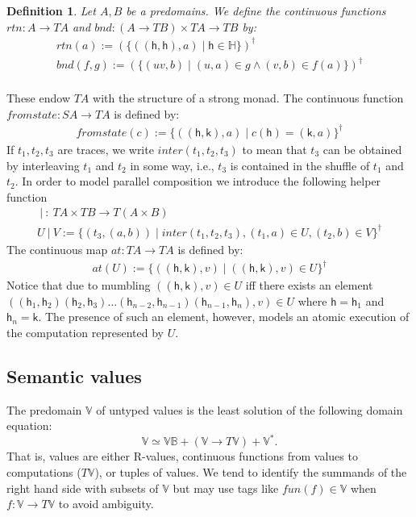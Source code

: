 \documentclass[nocopyrightspace,preprint]{sigplanconf}
\newcommand{\funn}[1]{\textit{fun}(#1)}
\newcommand{\semparallel}{~|~}
\newcommand{\Stores}{\ensuremath{\mathbb{H}}}
\newtheorem{definition}[theorem]{Definition}
\newcommand\heap{\ensuremath{\mathsf{h}}\xspace}
\newcommand\h{\heap}
\renewcommand\k{\ensuremath{\mathsf{k}}\xspace}
\newcommand{\Values}{\mathbb{V}}
\newcommand{\ValuesB}{\mathbb{VB}}
\newcommand{\tup}[1]{(#1)}
\begin{document}
\begin{definition}
Let $A,B$ be a predomains.  We define the continuous
functions $\textit{rtn} : A \rightarrow TA$ and $\textit{bnd} :
(A{\rightarrow} TB)\times TA\rightarrow TB$ by:
\[\begin{array}{l}
 \textit{rtn}(a):= (\{\tup{(\h,\h),a} \mid \h\in\Stores\})^\dagger\\ \textit{bnd}(f,g) := (\{\tup{uv,b}\mid \tup{u,a}\in g\wedge \tup{v,b}\in f(a)\})^\dagger\\
\end{array}\]
\end{definition}
\noindent
These endow $TA$ with the structure of a strong monad. The continuous function
$\textit{fromstate} : SA\rightarrow TA$ is defined by:
\[
\begin{array}{l}
 \textit{fromstate}(c) := \{\tup{(\h,\k),a}\mid 
c(\h)=\tup{\k,a}\}^\dagger
\end{array}
\]
If $t_1,t_2,t_3$ are traces, we write $\textit{inter}(t_1,t_2,t_3)$ to
mean that $t_3$ can be obtained by interleaving $t_1$ and $t_2$ in
some way, i.e., $t_3$ is contained in the shuffle of $t_1$ and $t_2$.
In order to model parallel composition we introduce the following
helper function
\[
\begin{array}{l}
 \semparallel :~ TA\times TB\rightarrow T(A\times B)\\
U\semparallel V := \{\tup{t_3,(a,b)}\mid \textit{inter} (t_1,t_2,t_3), \tup{t_1,a}\in U, \tup{t_2,b}\in V\}^\dagger
\end{array}
\]
The continuous map $\textit{at} : TA\rightarrow TA$ is defined by:
\[
\begin{array}{l}
 \textit{at}(U) := \{\tup{(\h,\k),v}\mid ((\h,\k),v)\in U\}^\dagger
\end{array}
\]
\noindent
Notice that due to mumbling $\tup{(\h,\k),v}\in U$ iff
there exists an element $\tup{(\h_1,\h_2)(\h_2,\h_3)\dots
  (\h_{n-2},\h_{n-1})(\h_{n-1},\h_n),v}\in U$ where $\h=\h_1$ and
$\h_n=\k$. The presence of such an element, however, models an atomic
execution of the computation represented by $U$.


\subsection{Semantic values}
The predomain $\Values$ of untyped values
is the least solution of the following domain equation: 
\[
\Values \simeq \ValuesB + (\Values\rightarrow T\Values) + \Values^*.
\]
That is, values are either R-values, continuous functions from values to computations ($T\Values$), or tuples of values.
We tend to identify the summands of the right hand side with subsets
of $\Values$ but may use tags like $\funn f\in\Values$ when
$f:\Values\rightarrow T\Values$ to avoid ambiguity.
\end{document}
